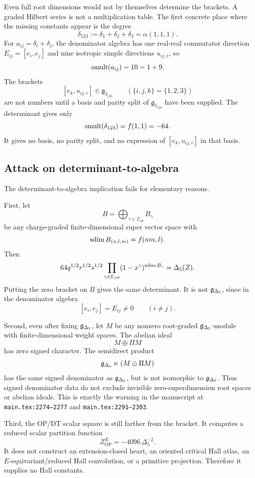Even full root dimensions would not by themselves determine the brackets.
A graded Hilbert series is not a multiplication table.  The first concrete
place where the missing constants appear is the degree
\[
\delta_{123}:=\delta_1+\delta_2+\delta_3=\alpha(1,1,1).
\]
For \(a_{ij}=\delta_i+\delta_j\), the denominator algebra has one
real-real commutator direction \(E_{ij}=[e_i,e_j]\) and nine isotropic
simple directions \(u_{ij,r}\), so
\[
\operatorname{smult}(a_{ij})=10=1+9.
\]
The brackets
\[
[e_k,u_{ij,r}]\in\mathfrak g_{\delta_{123}}
\qquad(\{i,j,k\}=\{1,2,3\})
\]
are not numbers until a basis and parity split of
\(\mathfrak g_{\delta_{123}}\) have been supplied.  The determinant gives
only
\[
\operatorname{smult}(\delta_{123})=f(1,1)=-64.
\]
It gives no basis, no parity split, and no expression of
\([e_k,u_{ij,r}]\) in that basis.

\subsection{Attack on determinant-to-algebra}

The determinant-to-algebra implication fails for elementary reasons.

First, let
\[
B=\bigoplus_{\gamma\in\Gamma_{\mathrm{eff}}}B_\gamma
\]
be any charge-graded finite-dimensional super vector space with
\[
\operatorname{sdim} B_{(n,l,m)}=f(nm,l).
\]
Then
\[
64q^{1/2}r^{1/2}s^{1/2}
\prod_{\gamma\in\Gamma_{\mathrm{eff}}}(1-x^\gamma)^{\operatorname{sdim} B_\gamma}
=\Delta_5(Z).
\]
Putting the zero bracket on \(B\) gives the same determinant.  It is not
\(\mathfrak g_{\Delta_5}\), since in the denominator algebra
\[
[e_i,e_j]=E_{ij}\ne0\qquad(i\ne j).
\]

Second, even after fixing \(\mathfrak g_{\Delta_5}\), let \(M\) be any nonzero
root-graded \(\mathfrak g_{\Delta_5}\)-module with finite-dimensional weight spaces.
The abelian ideal
\[
M\oplus \Pi M
\]
has zero signed character.  The semidirect product
\[
\mathfrak g_{\Delta_5}\ltimes (M\oplus\Pi M)
\]
has the same signed denominator as \(\mathfrak g_{\Delta_5}\), but is not isomorphic to
\(\mathfrak g_{\Delta_5}\).  Thus signed denominator data do not exclude invisible
zero-superdimension root spaces or abelian ideals.
This is exactly the warning in the manuscript at
\texttt{main.tex:2274--2277} and \texttt{main.tex:2291--2303}.

Third, the OP/DT scalar square is still farther from the bracket.  It
computes a reduced scalar partition function
\[
Z^X_{\mathrm{OP}}=-4096\,\Delta_5^{-2}.
\]
It does not construct an extension-closed heart, an oriented critical Hall
atlas, an \(E\)-equivariant/reduced Hall convolution, or a primitive
projection.  Therefore it supplies no Hall constants.

